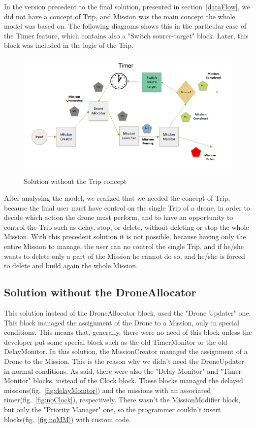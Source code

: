 In the version precedent to the final solution, presented in section~\ref{dataFlow}, we did not have a concept of Trip, and Mission was the main concept the whole model was based on. The following diagrams shows this in the particular case of the Timer feature, which contains also a "Switch source-target" block. Later, this block was included in the logic of the Trip.

\begin{figure}[H]
  \centering
  \includegraphics[width=\linewidth]{pictures/NoTrip.png}
  \caption{Solution without the Trip concept}
  \label{fig:noTrip}
\end{figure}

After analysing the model, we realized that we needed the concept of Trip, because the final user must have control on the single Trip of a drone, in order to decide which action the drone must perform, and to have an opportunity to control the Trip such as delay, stop, or delete, without deleting or stop the whole Mission. With this precedent solution it is not possible, because having only the entire  Mission to manage, the user can no control the single Trip, and if he/she wants to delete only a part of the Mission he cannot do so, and he/she is forced to delete and build again the whole Mission.

\subsection{Solution without the DroneAllocator}


This solution instead of the DroneAllocator block, used the "Drone Updater" one. This block managed the assignment of the Drone to a Mission, only in special conditions. This means that, generally, there were no need of this block unless the developer put some special block such as the old TimerMonitor or the old DelayMonitor.
In this solution, the MissionCreator managed the assignment of a Drone to the Mission. This is the reason why we didn't need the DroneUpdater in normal conditions.
As said, there were also the "Delay Monitor" and "Timer Monitor" blocks, instead of the Clock block.
These blocks managed the delayed missions(fig.~\ref{fig:delayMonitor}) and the missions with an associated timer(fig.~\ref{fig:noClock}), respectively.
There wasn't the MissionModifier block, but only the "Priority Manager" one, so the programmer couldn't insert blocks(fig.~\ref{fig:noMM}) with custom code.

